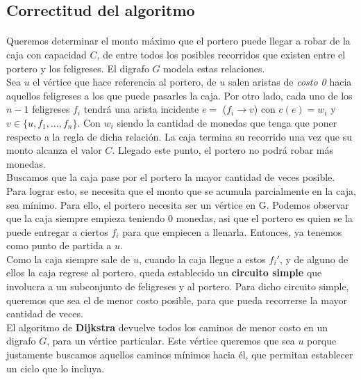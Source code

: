 \documentclass[../main.tex]{subfiles}
\begin{document}
\subsection{Correctitud del algoritmo}
\label{sec:ej3-proof}
\paragraph{} Queremos determinar el monto máximo que el portero puede llegar a robar de la caja con capacidad $C$, de entre todos los posibles recorridos que existen entre el portero y los feligreses. El digrafo $G$ modela estas relaciones. \\
Sea $u$ el vértice que hace referencia al portero, de $u$ salen aristas de \textit{costo 0} hacia aquellos feligreses a los que puede pasarles la caja. Por otro lado, cada uno de los $n-1$ feligreses $f_i$ tendrá una arista incidente $e =$ ($f_i \rightarrow v$) con $c(e) = w_i$ y $v \in \lbrace u, f_1, ..., f_n \rbrace $. Con $w_i$ siendo la cantidad de monedas que tenga que poner respecto a la regla de dicha relación. La caja termina su recorrido una vez que su monto alcanza el valor $C$. Llegado este punto, el portero no podrá robar más monedas. \\
Buscamos que la caja pase por el portero la mayor cantidad de veces posible. Para lograr esto, se necesita que el monto que se acumula parcialmente en la caja, sea m\'inimo. Para ello, el portero necesita ser un vértice en G. %
Podemos observar que la caja siempre empieza teniendo 0 monedas, asi que el portero es quien se la puede entregar a ciertos $f_i$ para que empiecen a llenarla. Entonces, ya tenemos como punto de partida a $u$. \\
Como la caja siempre sale de $u$, cuando la caja llegue a estos $f_i'$, y de alguno de ellos la caja regrese al portero, queda establecido un \textbf{circuito simple} que involucra a un subconjunto de feligreses y al portero. %
Para dicho circuito simple, queremos que sea el de menor costo posible, para que pueda recorrerse la mayor cantidad de veces. \\
El algoritmo de \textbf{Dijkstra} devuelve todos los caminos de menor costo en un digrafo $G$, para un vértice particular. Este vértice queremos que sea $u$ porque justamente buscamos aquellos caminos mínimos hacia él, que permitan establecer un ciclo que lo incluya.
\end{document}
